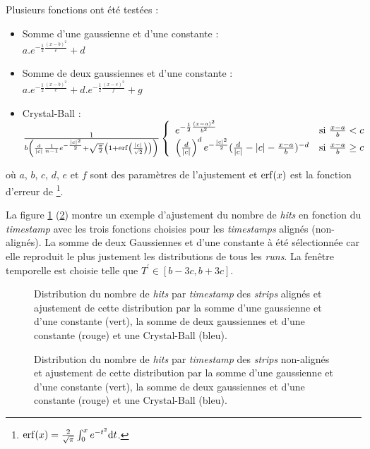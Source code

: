 Plusieurs fonctions ont été testées :
\begin{itemize}[label=$\bullet$]
	\item Somme d'une gaussienne et d'une constante : \\ $a.e^{-\frac{1}{2}\frac{(x-b)^2}{c}}+d$ 
	\item Somme de deux gaussiennes et d'une constante : \\ $a.e^{-\frac{1}{2}\frac{(x-b)^2}{c}}+d.e^{-\frac{1}{2}\frac{(x-e)^2}{f}}+g$ 
	\item Crystal-Ball : \\ $\frac{1}{b\left(\frac{d}{|c|}\frac{1}{n-1}e^{-\frac{|c|^2}{2}}+\sqrt{\frac{\pi}{2}}\left(1+\erf\left(\frac{|c|}{\sqrt{2}}\right)\right) \right)}\left\{
	\begin{array}{ll}
	e^{-\frac{1}{2}\frac{(x-a)^2}{b^2}} & \mbox{si } \frac{x-a}{b}<c \\
	\left(\frac{d}{|c|}\right)^d e^{-\frac{|c|^2}{2}} (\frac{d}{|c|}-|c|-\frac{x-a}{b})^{-d} & \mbox{si }\frac{x-a}{b}\geq c
	\end{array}
	\right.$
\end{itemize}
où $a$, $b$, $c$, $d$, $e$ et $f$ sont des paramètres de l'ajustement et $\erf(x)$ est la fonction d'erreur de \footnote{$\erf(x)=\frac{2}{\sqrt{\pi}}\int_0^x e^{-t^2} \dd t$.}.

La figure \ref{align} (\ref{nonalign}) montre un exemple d'ajustement du nombre de \textit{hits} en fonction du \textit{timestamp} avec les trois fonctions choisies pour les \textit{timestamps} alignés (non-alignés). La somme de deux Gaussiennes et d'une constante à été sélectionnée car elle reproduit le plus justement les distributions de tous les \textit{runs}. La fenêtre temporelle est choisie telle que $T^{'}\in \left[b-3c,b+3c\right]$.

\begin{figure}[ht!]
	\centering
	\caption{Distribution du nombre de \textit{hits} par \textit{timestamp} des \textit{strips} alignés et ajustement de cette distribution par la somme d'une gaussienne et d'une constante (vert), la somme de deux gaussiennes et d'une constante (rouge) et une Crystal-Ball (bleu).}
	\label{align}
\end{figure}

\begin{figure}[ht!]
	\centering
	\caption{Distribution du nombre de \textit{hits} par \textit{timestamp} des \textit{strips} non-alignés et ajustement de cette distribution par la somme d'une gaussienne et d'une constante (vert), la somme de deux gaussiennes et d'une constante (rouge) et une Crystal-Ball (bleu).}
	\label{nonalign}
\end{figure}

